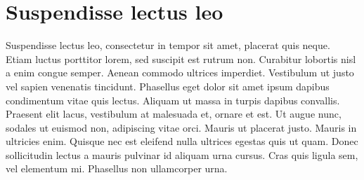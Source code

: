\documentclass{abntex2}
\begin{document}
\section{Suspendisse lectus leo}

Suspendisse lectus leo, consectetur in tempor sit amet, placerat quis neque.
Etiam luctus porttitor lorem, sed suscipit est rutrum non. Curabitur lobortis
nisl a enim congue semper. Aenean commodo ultrices imperdiet. Vestibulum ut
justo vel sapien venenatis tincidunt. Phasellus eget dolor sit amet ipsum
dapibus condimentum vitae quis lectus. Aliquam ut massa in turpis dapibus
convallis. Praesent elit lacus, vestibulum at malesuada et, ornare et est. Ut
augue nunc, sodales ut euismod non, adipiscing vitae orci. Mauris ut placerat
justo. Mauris in ultricies enim. Quisque nec est eleifend nulla ultrices
egestas quis ut quam. Donec sollicitudin lectus a mauris pulvinar id aliquam
urna cursus. Cras quis ligula sem, vel elementum mi. Phasellus non ullamcorper
urna.
\end{document}
